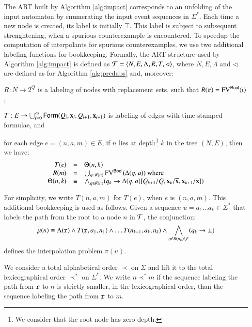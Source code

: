 \documentclass[10pt,conference,letterpaper,twocolumn]{IEEEtran}
\begin{document}
The ART built by Algorithm \ref{alg:impact} corresponds to an
unfolding of the input automaton by enumerating the input event
sequences in $\Sigma^*$. Each time a new node is created, its label is
initially $\top$. This label is subject to subsequent strenghtening,
when a spurious counterexample is encountered. To speedup the
computation of interpolants for spurious counterexamples, we use two
additional labeling functions for bookkeeping. Formally, the ART
structure used by Algorithm \ref{alg:impact} is defined as $\mathcal{T} =
\left\langle N,E,\Lambda,R,T,\lhd \right\rangle$, where $N,E,\Lambda$ and $\lhd$ are
defined as for Algorithm \ref{alg:predabs} and,
moreover: \begin{compactitem}
\item $R : N \rightarrow 2^Q$ is a labeling of nodes with replacement
  sets, such that $R(\mathtt{r}) = \mathrm{FV}^{\mathsf{Bool}}(\iota)$, 
%
\item $T : E \rightarrow \bigcup_{i=0}^\infty
  \mathsf{Form}(Q_i,\mathbf x_i,Q_{i+1},\mathbf x_{i+1})$ is labeling of edges
  with time-stamped formulae, and
%
\item for each edge $e = (n,a,m) \in E$, if $n$ lies at
  depth\footnote{We consider that the root node has zero depth.}  $k$
  in the tree $(N,E)$, then we have:
  \[\begin{array}{rcl}
  T(e) & = & \Theta(n,k) \\
  R(m) & = & \bigcup_{q \in R(n)}\mathrm{FV}^{\mathsf{Bool}}(\Delta(q,a)) \text{ where} \\
  \Theta(n,k) & \equiv & \bigwedge_{q \in R(n)} (q_k \rightarrow
  \Delta(q,a)[Q_{k+1}/Q,\mathbf x_{k}/\overline{\mathbf x},\mathbf x_{k+1}/\mathbf x])
  \end{array}\]
\end{compactitem}
For simplicity, we write $T(n,a,m)$ for $T(e)$, when $e$ is
$(n,a,m)$. This additional bookkeeping is used as follows. Given a
sequence $u = a_1\ldots a_k \in \Sigma^*$ that labels the path from
the root to a node $n$ in $\mathcal{T}$, the conjunction:
\[\mu(n) \equiv \Lambda(\mathtt{r}) \wedge T(\mathtt{r},a_1,n_1) \wedge \ldots
T(n_{k-1},a_k,n_k) \wedge \bigwedge_{q \in R(n_k) \setminus F}(q_k
\rightarrow \bot)\] defines the interpolation problem $\pi(u)$.

We consider a total alphabetical order $\prec$ on $\Sigma$ and lift it
to the total lexicographical order $\prec^*$ on $\Sigma^*$. We write
$n \prec^* m$ if the sequence labeling the path from $\mathtt{r}$ to
$n$ is strictly smaller, in the lexicographical order, than the
sequence labeling the path from $\mathtt{r}$ to $m$. 
\end{document}
